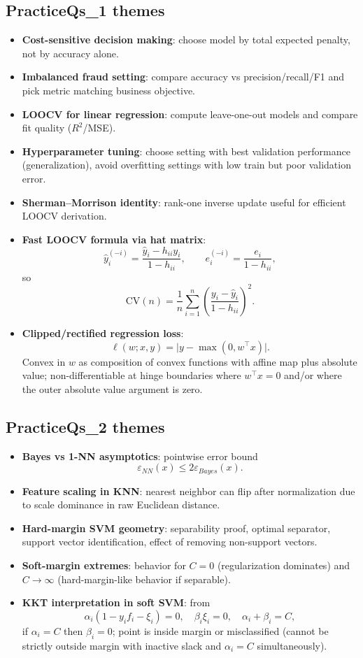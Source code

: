 \documentclass[11pt]{article}
\newcommand{\1}{\mathbf{1}}
\begin{document}
\subsection*{PracticeQs\_1 themes}
\begin{itemize}
\item \textbf{Cost-sensitive decision making}: choose model by total expected penalty, not by accuracy alone.
\item \textbf{Imbalanced fraud setting}: compare accuracy vs precision/recall/F1 and pick metric matching business objective.
\item \textbf{LOOCV for linear regression}: compute leave-one-out models and compare fit quality ($R^2$/MSE).
\item \textbf{Hyperparameter tuning}: choose setting with best validation performance (generalization), avoid overfitting settings with low train but poor validation error.
\item \textbf{Sherman--Morrison identity}: rank-one inverse update useful for efficient LOOCV derivation.
\item \textbf{Fast LOOCV formula via hat matrix}:
\[
\hat y_i^{(-i)}=\frac{\hat y_i-h_{ii}y_i}{1-h_{ii}},
\qquad
e_i^{(-i)}=\frac{e_i}{1-h_{ii}},
\]
so
\[
\text{CV}(n)=\frac1n\sum_{i=1}^n\left(\frac{y_i-\hat y_i}{1-h_{ii}}\right)^2.
\]
\item \textbf{Clipped/rectified regression loss}:
\[
\ell(w;x,y)=\big|y-\max(0,w^\top x)\big|.
\]
Convex in $w$ as composition of convex functions with affine map plus absolute value; non-differentiable at hinge boundaries where $w^\top x=0$ and/or where the outer absolute value argument is zero.
\end{itemize}

\subsection*{PracticeQs\_2 themes}
\begin{itemize}
\item \textbf{Bayes vs 1-NN asymptotics}: pointwise error bound
\[
\varepsilon_{NN}(x)\le2\varepsilon_{Bayes}(x).
\]
\item \textbf{Feature scaling in KNN}: nearest neighbor can flip after normalization due to scale dominance in raw Euclidean distance.
\item \textbf{Hard-margin SVM geometry}: separability proof, optimal separator, support vector identification, effect of removing non-support vectors.
\item \textbf{Soft-margin extremes}: behavior for $C=0$ (regularization dominates) and $C\to\infty$ (hard-margin-like behavior if separable).
\item \textbf{KKT interpretation in soft SVM}: from
\[
\alpha_i(1-y_if_i-\xi_i)=0,\quad \beta_i\xi_i=0,\quad \alpha_i+\beta_i=C,
\]
if $\alpha_i=C$ then $\beta_i=0$; point is inside margin or misclassified (cannot be strictly outside margin with inactive slack and $\alpha_i=C$ simultaneously).
\end{itemize}
\end{document}
